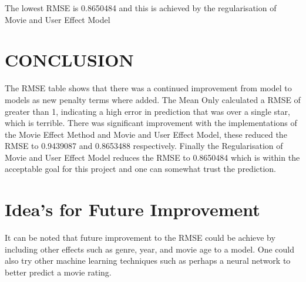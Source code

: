 \documentclass[
]{article}
\begin{document}
The lowest RMSE is 0.8650484 and this is achieved by the regularisation
of Movie and User Effect Model

\hypertarget{conclusion}{%
\section{CONCLUSION}\label{conclusion}}

The RMSE table shows that there was a continued improvement from model
to models as new penalty terms where added. The Mean Only calculated a
RMSE of greater than 1, indicating a high error in prediction that was
over a single star, which is terrible. There was significant improvement
with the implementations of the Movie Effect Method and Movie and User
Effect Model, these reduced the RMSE to 0.9439087 and 0.8653488
respectively. Finally the Regularisation of Movie and User Effect Model
reduces the RMSE to 0.8650484 which is within the acceptable goal for
this project and one can somewhat trust the prediction.

\hypertarget{ideas-for-future-improvement}{%
\section{Idea's for Future
Improvement}\label{ideas-for-future-improvement}}

It can be noted that future improvement to the RMSE could be achieve by
including other effects such as genre, year, and movie age to a model.
One could also try other machine learning techniques such as perhaps a
neural network to better predict a movie rating.
\end{document}
